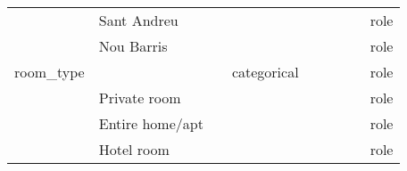 \begin{center}
\begin{longtable}{@{}llllllll@{}}
                            & Sant Andreu                 &                                   &             &                &                             &                     &         & role \\
                            & Nou Barris                  &                                   &             &                &                             &                     &         & role \\
room\_type                  &                             &                                   & categorical &                &                             &                     &         & role \\
                            & Private room                &                                   &             &                &                             &                     &         & role \\
                            & Entire home/apt  &                                   &             &                &                             &                     &         & role \\
                                                        & Hotel room  &                                   &             &                &                             &                     &         & role \\


\end{longtable}
\end{center}
